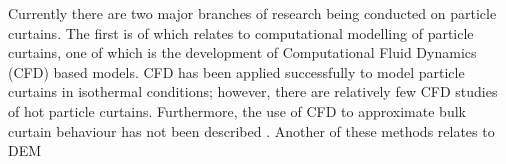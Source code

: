 \documentclass[12pt]{article}
\newcommand{\ts}{\textsuperscript}
\newcommand{\pe}{\vspace{0.3cm}}
\newcommand{\mycite}[1]{\ts{\cite{#1}}}
\begin{document}
\pe 


\begin{comment}
Particle curtains are defined as a continuous stream of particles made to fall in a curtain-like
shape through a gaseous medium. They are employed in a wide variety of industries as heat
exchangers for particulate mediums, due primarily to their simplicity and low operational costs \ts{\cite{AfsharCurtainPhd, AndrewLeePhd}}. Examples include the flighted rotary dryer (FRD) and the hopper, which are common in mineral and pharmaceutical industries. However, particle curtains are steadily emerging in promising new renewable energy technologies for use in concentrating solar power (CSP) plants. These solar particle receiver designs are currently in the early demonstration phase, delivering improved thermal efficiency through their direct storage of heat within sand-like particles \ts{\cite{christian2015system, viebahn2011potential}}.
\end{comment}


Currently there are two major branches of research being conducted on particle curtains. The first is of which relates to computational modelling of particle curtains, one of which is the development of Computational Fluid Dynamics (CFD) based models. CFD has been applied successfully to model particle curtains in isothermal conditions; however, there are relatively few CFD studies of hot
particle curtains. Furthermore, the use of CFD to approximate bulk curtain behaviour has not been
described \mycite{AfsharCurtainPhd}. Another of these methods relates to DEM







\end{document}
